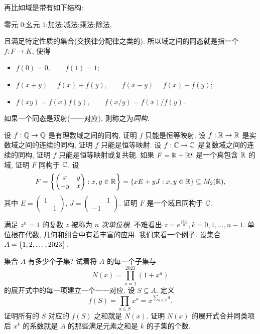 \begin{homework}
\begin{exlist}
      再比如域是带有如下结构:
      \begin{center}
        零元 $0$;\qquad 幺元 $1$;\qquad 加法;\qquad 减法;\qquad 乘法;\qquad 除法, 
      \end{center}
      且满足特定性质的集合(交换律分配律之类的). 所以域之间的同态就是指一个 $f:F\to K$, 使得
      \begin{itemize}
        \item $f(0)=0,\qquad f(1)=1$;
        \item $f(x+y)=f(x)+f(y),\qquad f(x-y)=f(x)-f(y)$;
        \item $f(xy)=f(x)f(y),\qquad f(x/y)=f(x)/f(y)$.
      \end{itemize}
      如果一个同态是双射(一一对应), 则称之为\emph{同构}.
      \begin{tasks}
        \task 设 $f:{\mathbb{Q}}\to{\mathbb{Q}}$ 是有理数域之间的同构, 证明 $f$ 只能是恒等映射.
        \task 设 $f:{\mathbb{R}}\to{\mathbb{R}}$ 是实数域之间的连续的同构, 证明 $f$ 只能是恒等映射.
        \task 设 $f:{\mathbb{C}}\to{\mathbb{C}}$ 是复数域之间的连续的同构, 证明 $f$ 只能是恒等映射或复共轭.
        \task 如果 $F={\mathbb{R}}+{\mathbb{R}} t$ 是一个真包含 ${\mathbb{R}}$ 的域, 证明 $F$ 同构于 ${\mathbb{C}}$.
        \task 设
        \[F={\left\{\begin{pmatrix}
        x&y\\-y&x\end{pmatrix}: x,y\in{\mathbb{R}}\right\}}
        ={\left\{xE+yJ: x,y\in{\mathbb{R}}\right\}}\subseteq M_2({\mathbb{R}}),\]
        其中 $E=\begin{pmatrix}1& \\&1\end{pmatrix}$,
        $J=\begin{pmatrix}&1\\-1&\end{pmatrix}$.
        证明 $F$ 是一个域且同构于 ${\mathbb{C}}$.
      \end{tasks}
    \item 满足 $z^n=1$ 的复数 $z$ 被称为 \emph{$n$ 次单位根}.
      不难看出 $z=e^{\frac{2k\pi i}n},k=0,1,\dots,n-1$.
      单位根在代数, 几何和组合中有着丰富的应用. 我们来看一个例子.
      设集合 $A={\left\{1,2,\dots,2023\right\}}$.
      \begin{tasks}
        \task 集合 $A$ 有多少个子集? 试着将 $A$ 的每一个子集与
        \[N(x)=\prod_{a=1}^{2023}(1+x^a)\]
        的展开式中的每一项建立一个一一对应.
        \task 设 $S\subseteq A$. 定义
        \[f(S)=\prod_{a\in S}x^a=x^{\sum_{a\in S}a}.\]
        证明所有的 $S$ 对应的 $f(S)$ 之和就是 $N(x)$.
        \task 证明 $N(x)$ 的展开式合并同类项后 $x^k$ 的系数就是 $A$ 的那些满足元素之和是 $k$ 的子集的个数.

\end{tasks}
\end{exlist}
\end{homework}
